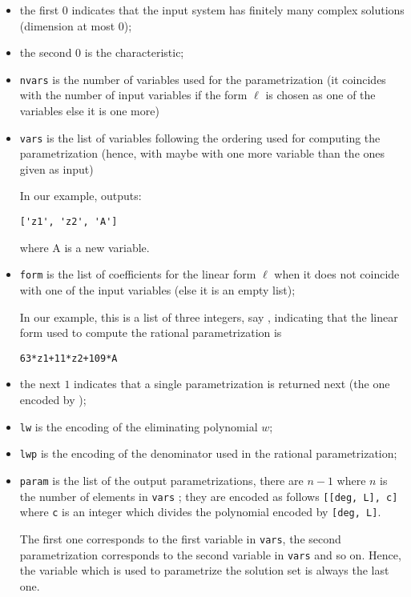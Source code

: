 \documentclass[a4paper,english,11pt]{scrartcl}
\def\tt{\ttfamily}
\theoremstyle{definition}
\theoremstyle{remark}
\begin{document}
\begin{itemize}
\item the first $0$ indicates that the input system has finitely
  many complex solutions (dimension at most $0$);
\item the second $0$ is the characteristic;
\item \texttt{nvars} is the number of variables used for the parametrization (it
  coincides with the number of input variables if the form $\ell$ is chosen
  as one of the variables else it is one more)
\item \texttt{vars} is the list of variables following the ordering used for
  computing the parametrization (hence, with maybe with one
  more variable than the ones given as input)

  In our example, \msolve outputs:
\begin{verbatim}
['z1', 'z2', 'A']
\end{verbatim}
where {\tt A} is a new variable. 

\item \texttt{form} is the list of coefficients for the linear form $\ell$ when
  it does not coincide with one of the input variables (else it is an empty list);

  In our example, this is a list of three integers, say {\tt [63, 11, 109]}, 
  indicating that the linear form used to compute the rational parametrization is 
\begin{verbatim}
63*z1+11*z2+109*A
\end{verbatim}
\item the next $1$ indicates that a single parametrization is returned next (the one encoded by {\tt [lw, lwp, param]});
\item \texttt{lw} is the encoding of the eliminating polynomial $w$;
\item \texttt{lwp} is the encoding of the denominator used in the rational
  parametrization;
\item \texttt{param} is the list of the output parametrizations, there are $n-1$ where 
    $n$ is the number of elements in \verb+vars+ ; 
    they are encoded as follows \verb+[[deg, L], c]+ where \verb+c+ is 
    an integer which divides the polynomial encoded by \verb+[deg, L]+. 

    The first one corresponds to the first variable in \verb+vars+, the 
    second parametrization corresponds to the second variable in \verb+vars+ 
    and so on. Hence, the variable which is used to parametrize the solution 
    set is always the last one.
\end{itemize}
\end{document}
